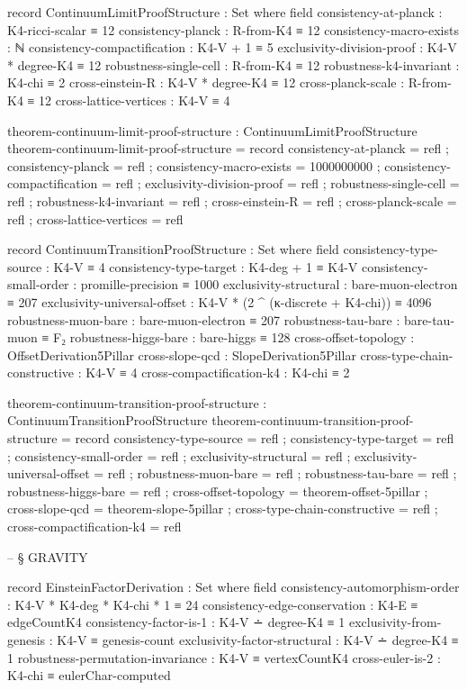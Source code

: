 \documentclass[11pt,a4paper]{book}
\begin{document}
\begin{code}
record ContinuumLimitProofStructure : Set where
  field
    consistency-at-planck : K4-ricci-scalar ≡ 12
    consistency-planck : R-from-K4 ≡ 12
    consistency-macro-exists : ℕ
    consistency-compactification : K4-V + 1 ≡ 5
    exclusivity-division-proof : K4-V * degree-K4 ≡ 12
    robustness-single-cell : R-from-K4 ≡ 12
    robustness-k4-invariant : K4-chi ≡ 2
    cross-einstein-R : K4-V * degree-K4 ≡ 12
    cross-planck-scale : R-from-K4 ≡ 12
    cross-lattice-vertices : K4-V ≡ 4

theorem-continuum-limit-proof-structure : ContinuumLimitProofStructure
theorem-continuum-limit-proof-structure = record
  { consistency-at-planck = refl
  ; consistency-planck = refl
  ; consistency-macro-exists = 1000000000
  ; consistency-compactification = refl
  ; exclusivity-division-proof = refl
  ; robustness-single-cell = refl
  ; robustness-k4-invariant = refl
  ; cross-einstein-R = refl
  ; cross-planck-scale = refl
  ; cross-lattice-vertices = refl
  }

record ContinuumTransitionProofStructure : Set where
  field
    consistency-type-source : K4-V ≡ 4
    consistency-type-target : K4-deg + 1 ≡ K4-V
    consistency-small-order : promille-precision ≡ 1000
    exclusivity-structural : bare-muon-electron ≡ 207
    exclusivity-universal-offset : K4-V * (2 ^ (κ-discrete + K4-chi)) ≡ 4096
    robustness-muon-bare : bare-muon-electron ≡ 207
    robustness-tau-bare : bare-tau-muon ≡ F₂
    robustness-higgs-bare : bare-higgs ≡ 128
    cross-offset-topology : OffsetDerivation5Pillar
    cross-slope-qcd : SlopeDerivation5Pillar
    cross-type-chain-constructive : K4-V ≡ 4
    cross-compactification-k4 : K4-chi ≡ 2

theorem-continuum-transition-proof-structure : ContinuumTransitionProofStructure
theorem-continuum-transition-proof-structure = record
  { consistency-type-source = refl
  ; consistency-type-target = refl
  ; consistency-small-order = refl
  ; exclusivity-structural = refl
  ; exclusivity-universal-offset = refl
  ; robustness-muon-bare = refl
  ; robustness-tau-bare = refl
  ; robustness-higgs-bare = refl
  ; cross-offset-topology = theorem-offset-5pillar
  ; cross-slope-qcd = theorem-slope-5pillar
  ; cross-type-chain-constructive = refl
  ; cross-compactification-k4 = refl
  }


-- § GRAVITY

record EinsteinFactorDerivation : Set where
  field
    consistency-automorphism-order : K4-V * K4-deg * K4-chi * 1 ≡ 24
    consistency-edge-conservation : K4-E ≡ edgeCountK4
    consistency-factor-is-1 : K4-V ∸ degree-K4 ≡ 1
    exclusivity-from-genesis : K4-V ≡ genesis-count
    exclusivity-factor-structural : K4-V ∸ degree-K4 ≡ 1
    robustness-permutation-invariance : K4-V ≡ vertexCountK4
    cross-euler-is-2 : K4-chi ≡ eulerChar-computed


\end{code}
\end{document}
